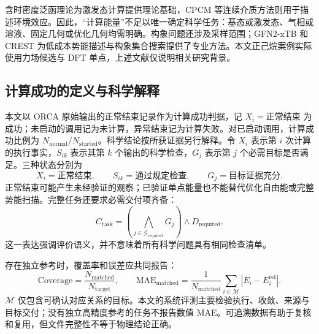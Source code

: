 含时密度泛函理论为激发态计算提供理论基础\cite{tddft}，CPCM 等连续介质方法则用于描述环境效应\cite{cpcm}。因此，“计算能量”不足以唯一确定科学任务：基态或激发态、气相或溶液、固定几何或优化几何均需明确。构象问题还涉及采样范围；GFN2-xTB 和 CREST 为低成本势能描述与构象集合搜索提供了专业方法\cite{gfn2,crest}。本文正己烷案例实际使用力场候选与 DFT 单点，上述文献仅说明相关研究背景。

\subsection{计算成功的定义与科学解释}
本文以 ORCA 原始输出的正常结束记录作为计算成功判据，记 $X_i=\text{正常结束}$ 为成功；未启动的调用记为未计算，异常结束记为计算失败。对已启动调用，计算成功比例为 $N_{\mathrm{normal}}/N_{\mathrm{started}}$。科学结论按所获证据另行解释。令 $X_i$ 表示第 $i$ 次计算的执行事实，$S_{ik}$ 表示其第 $k$ 个输出的科学检查，$G_j$ 表示第 $j$ 个必需目标是否满足。三种状态分别为
\begin{equation}
X_i=\text{正常结束},\qquad
S_{ik}=\text{通过规定检查},\qquad
G_j=\text{目标证据充分}.
\label{eq:states}
\end{equation}
正常结束可能产生未经验证的观察；已验证单点能量也不能替代优化自由能或完整势能扫描。完整任务还要求必需交付项齐备：
\begin{equation}
C_{\mathrm{task}}
=\left(\bigwedge_{j\in\mathcal G_{\mathrm{required}}}G_j\right)
\land D_{\mathrm{required}}.
\label{eq:complete}
\end{equation}
这一表达强调评价语义，并不意味着所有科学问题具有相同检查清单。

存在独立参考时，覆盖率和误差应共同报告：
\begin{equation}
\mathrm{Coverage}=\frac{N_{\mathrm{matched}}}{N_{\mathrm{target}}},
\qquad
\mathrm{MAE}_{\mathrm{matched}}
=\frac{1}{N_{\mathrm{matched}}}\sum_{i\in\mathcal M}
|E_i-E_i^{\mathrm{ref}}|.
\end{equation}
$\mathcal M$ 仅包含可确认对应关系的目标。本文的系统评测主要检验执行、收敛、来源与目标交付；没有独立高精度参考的任务不报告数值 MAE。可追溯数据有助于复核和复用\cite{fair}，但文件完整性不等于物理结论正确。

